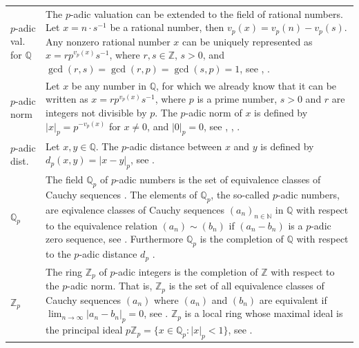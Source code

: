\documentclass[12pt]{amsart}
\theoremstyle{definition}
\begin{document}
{\renewcommand{\arraystretch}{1.8}
\begin{table}[H]
	\centering
	\begin{tabular}{|P{1.4cm} p{13.4cm}|}
		\hline
		$p$-adic val. for $\mathbb{Q}$ & The $p$-adic valuation can be extended to the field of rational numbers. Let $x=n\cdot s^{-1}$ be a rational number, then $v_p(x)=v_p(n)-v_p(s)$. Any nonzero rational number $x$ can be uniquely represented as $x=rp^{v_p(x)}s^{-1}$, where $r,s\in\mathbb{Z}$, $s>0$, and $\gcd(r,s)=\gcd(r,p)=\gcd(s,p)=1$, see \cite[p.~154]{Ref_Schmidt_2007}, \cite{Ref_Weisstein_1}.
		\\
		$p$-adic norm & Let $x$ be any number in $\mathbb{Q}$, for which we already know that it can be written as $x=rp^{v_p(x)}s^{-1}$, where $p$ is a prime number, $s>0$ and $r$ are integers not divisible by $p$. The $p$-adic norm of $x$ is defined by $|x|_p=p^{-v_p(x)}$ for $x\ne0$, and $|0|_p=0$, see \cite{Ref_Herwig_2011}, \cite[p.~154]{Ref_Schmidt_2007}, \cite{Ref_Weisstein_2}.
		\\
		$p$-adic dist. &  Let $x,y\in\mathbb{Q}$. The $p$-adic distance between $x$ and $y$ is defined by $d_p(x,y)=|x-y|_p$, see \cite[p.~155]{Ref_Schmidt_2007}.
		\\
		$\mathbb{Q}_p$ & The field $\mathbb{Q}_p$ of $p$-adic numbers is the set of equivalence classes of Cauchy sequences \cite[p.~10]{Ref_Koblitz_1984}. The elements of $\mathbb{Q}_p$, the so-called $p$-adic numbers, are eqivalence classes of Cauchy sequences $(a_n)_{n\in\mathbb{N}}$ in $\mathbb{Q}$ with respect to the equivalence relation $(a_n)\sim(b_n)$ if $(a_n-b_n)$ is a $p$-adic zero sequence, see \cite[p.~159]{Ref_Schmidt_2007}. Furthermore $\mathbb{Q}_p$ is the completion of $\mathbb{Q}$ with respect to the $p$-adic distance $d_p$ \cite[p.~159]{Ref_Schmidt_2007}. 
		\\
		$\mathbb{Z}_p$ & The ring $\mathbb{Z}_p$ of $p$-adic integers is the completion of $\mathbb{Z}$ with respect to the $p$-adic norm. That is, $\mathbb{Z}_p$ is the set of all equivalence classes of Cauchy sequences $(a_n)$ where $(a_n)$ and $(b_n)$ are equivalent if $\lim_{n\to\infty}|a_n-b_n|_p=0$, see \cite{Ref_Gupta_2018}. $\mathbb{Z}_p$ is a local ring whose maximal ideal is the principal ideal $p\mathbb{Z}_p=\{x\in\mathbb{Q}_p:|x|_p<1\}$, see \cite[p.~74]{Ref_Gouvea_2020}.
		\\ \hline
	\end{tabular}
\end{table}}



\vspace{1em}


\end{document}
